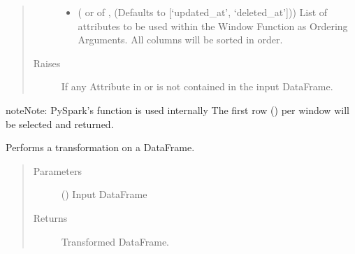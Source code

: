 \documentclass[a4paper,10pt, twoside,english]{sphinxmanual}
\begin{document}
\begin{fulllineitems}
\begin{quote}
\begin{description}
\begin{itemize}
\item {} 
 ( or  of , (Defaults to {[}‘updated\_at’, ‘deleted\_at’{]})) \textendash{} List of attributes to be used within the Window Function as Ordering Arguments.
All columns will be sorted in  order.

\end{itemize}

\item[{Raises}] \leavevmode
{} \textendash{} If any Attribute in  or  is not contained in the
input DataFrame.

\end{description}\end{quote}

\begin{sphinxadmonition}{note}{Note:}
PySpark’s  function is used internally
The first row () per window will be selected and returned.
\end{sphinxadmonition}

\begin{fulllineitems}
\label{\detokenize{transformer/newest_by_group:spooq2.transformer.newest_by_group.NewestByGroup.transform}}
Performs a transformation on a DataFrame.
\begin{quote}\begin{description}
\item[{Parameters}] \leavevmode
{} () \textendash{} Input DataFrame

\item[{Returns}] \leavevmode
Transformed DataFrame.


\end{description}
\end{quote}
\end{fulllineitems}
\end{fulllineitems}
\end{document}
